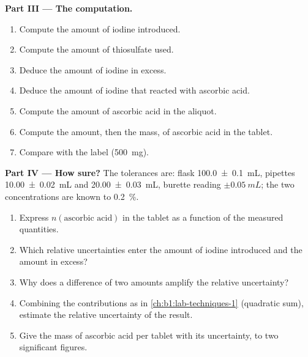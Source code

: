 \begin{problem}
\medskip
\noindent\textbf{Part III --- The computation.}
\begin{enumerate}[resume]
  \item Compute the amount of iodine introduced.
  \item Compute the amount of thiosulfate used.
  \item Deduce the amount of iodine in excess.
  \item Deduce the amount of iodine that reacted with ascorbic acid.
  \item Compute the amount of ascorbic acid in the aliquot.
  \item Compute the amount, then the mass, of ascorbic acid in the
        tablet.
  \item Compare with the label (\qty{500}{mg}).
\end{enumerate}

\medskip
\noindent\textbf{Part IV --- How sure?}
The tolerances are: flask \qty{100.0 \pm 0.1}{mL}, pipettes
\qty{10.00 \pm 0.02}{mL} and \qty{20.00 \pm 0.03}{mL}, burette reading
$\pm\qty{0.05}{mL}$; the two concentrations are known to \qty{0.2}{\percent}.
\begin{enumerate}[resume]
  \item Express $n(\text{ascorbic acid})$ in the tablet as a function of the
        measured quantities.
  \item Which relative uncertainties enter the amount of iodine introduced
        and the amount in excess?
  \item Why does a difference of two amounts amplify the relative
        uncertainty?
  \item Combining the contributions as in \cref{ch:b1:lab-techniques-1}
        (quadratic sum), estimate the relative uncertainty of the result.
  \item Give the mass of ascorbic acid per tablet with its uncertainty, to
        two significant figures.
\end{enumerate}
\end{problem}

